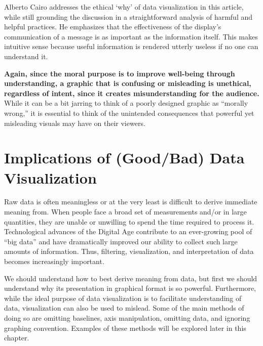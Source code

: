 \documentclass[]{book}
\begin{document}
Alberto Cairo addresses the ethical `why' of data visualization in this
article, while still grounding the discussion in a straightforward
analysis of harmful and helpful practices. He emphasizes that the
effectiveness of the display's communication of a message is as
important as the information itself. This makes intuitive sense because
useful information is rendered utterly useless if no one can understand
it.

\textbf{Again, since the moral purpose is to improve well-being through
understanding, a graphic that is confusing or misleading is unethical,
regardless of intent, since it creates misunderstanding for the
audience.} While it can be a bit jarring to think of a poorly designed
graphic as ``morally wrong,'' it is essential to think of the unintended
consequences that powerful yet misleading visuals may have on their
viewers.

\section{Implications of (Good/Bad) Data
Visualization}\label{implications-of-goodbad-data-visualization}

Raw data is often meaningless or at the very least is difficult to
derive immediate meaning from. When people face a broad set of
measurements and/or in large quantities, they are unable or unwilling to
spend the time required to process it. Technological advances of the
Digital Age contribute to an ever-growing pool of ``big data'' and have
dramatically improved our ability to collect such large amounts of
information. Thus, filtering, visualization, and interpretation of data
becomes increasingly important.

We should understand how to best derive meaning from data, but first we
should understand why its presentation in graphical format is so
powerful. Furthermore, while the ideal purpose of data visualization is
to facilitate understanding of data, visualization can also be used to
mislead. Some of the main methods of doing so are omitting baselines,
axis manipulation, omitting data, and ignoring graphing convention.
Examples of these methods will be explored later in this chapter.
\end{document}

